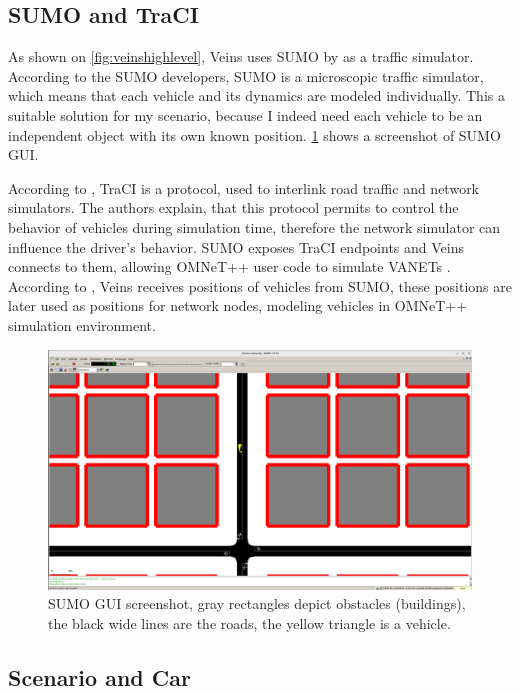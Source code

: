 \documentclass[]{nsm-thesis}
\begin{document}
\subsection{SUMO and TraCI}
As shown on \ref{fig:veinshighlevel}, Veins uses SUMO by \textcite[Page~218]{sumo2018} as a traffic simulator. According to the SUMO developers, SUMO is a microscopic traffic simulator, which means that each vehicle and its dynamics are modeled individually.
This a suitable solution for my scenario, because I indeed need each vehicle to be an independent object with its own known position. \cref{fig:sumogui} shows a screenshot of SUMO \ac{GUI}.

According to \textcite{traci}, \ac{TraCI} is a protocol, used to interlink road traffic and network simulators. The authors explain, that this protocol permits to control the behavior of vehicles during simulation time, therefore the network simulator can influence the driver's behavior. SUMO exposes \ac{TraCI} endpoints \cite{sumotraci} and Veins connects to them, allowing OMNeT++ user code to simulate \acp{VANET} \cite[Pages~217-218]{Sommer2019}. According to \textcite{Sommer2019}, Veins receives positions of vehicles from SUMO, these positions are later used as positions for network nodes, modeling vehicles in OMNeT++ simulation environment.

\begin{figure}
	\centering
	\includegraphics[width=1\textwidth]{figures/SUMO-GUI.png}
	\caption{SUMO \ac{GUI} screenshot, gray rectangles depict obstacles (buildings), the black wide lines are the roads, the yellow triangle is a vehicle.}
	\label{fig:sumogui}
\end{figure}

\subsection {Scenario and Car}
\label{sec:scenarioned}
\end{document}
